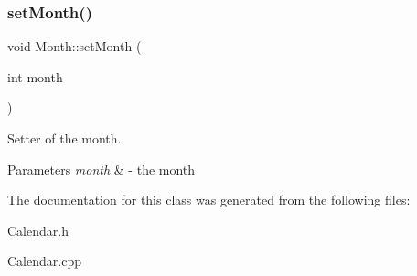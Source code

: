 \subsubsection{\texorpdfstring{set\+Month()}{setMonth()}}
{\footnotesize\ttfamily void Month\+::set\+Month (\begin{DoxyParamCaption}\item[{int}]{month }\end{DoxyParamCaption})}



Setter of the month. 


\begin{DoxyParams}{Parameters}
{\em month} & -\/ the month \\
\hline
\end{DoxyParams}


The documentation for this class was generated from the following files\+:\begin{DoxyCompactItemize}
\item 
Calendar.\+h\item 
Calendar.\+cpp\end{DoxyCompactItemize}
